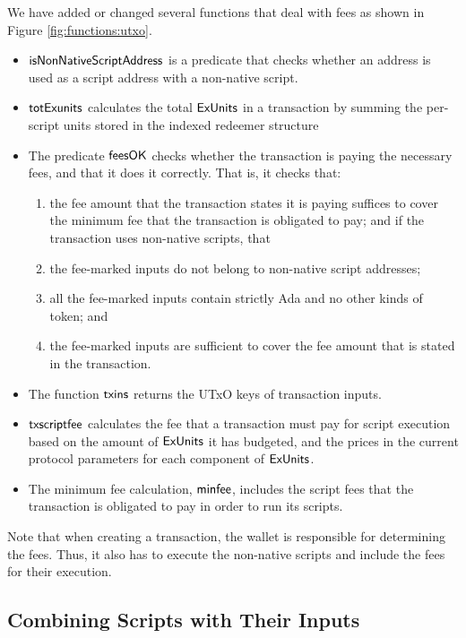 We have added or changed several functions that deal with fees as shown in Figure \ref{fig:functions:utxo}.

\begin{itemize}
  \item $\mathsf{isNonNativeScriptAddress}$ is a predicate that checks
  whether an address is used as a script address with a non-native
  script.
  \item $\mathsf{totExunits}$ calculates the total $\mathsf{ExUnits}$ in a transaction by summing
  the per-script units stored in the indexed redeemer structure
  \item The predicate $\mathsf{feesOK}$ checks whether the transaction is
  paying the necessary fees, and that it does it correctly. That is, it checks that:
  \begin{enumerate}[label=({\roman*})]
    \item the fee amount that the transaction states it is paying suffices to cover
    the minimum fee that the transaction is obligated to pay; and if the transaction uses non-native scripts, that
    \item the fee-marked inputs do not belong to non-native script addresses;
    \item all the fee-marked inputs contain strictly Ada and no other kinds of token; and
    \item the fee-marked inputs are sufficient to cover the fee amount that is stated
    in the transaction.
  \end{enumerate}
  \item The function $\mathsf{txins}$ returns the UTxO keys of transaction inputs.
  \item $\mathsf{txscriptfee}$ calculates the fee that a transaction must pay for script
  execution based on the amount of $\mathsf{ExUnits}$ it has budgeted, and the prices in the current protocol parameters
  for each component of $\mathsf{ExUnits}$.
  \item The minimum fee calculation, $\mathsf{minfee}$, includes the script
  fees that the transaction is obligated to pay in order to run its scripts.
\end{itemize}

Note that when creating a transaction, the wallet is responsible for
determining the fees. Thus, it also has to execute the non-native scripts
and include the fees for their execution.

\subsection{Combining Scripts with Their Inputs}
\label{sec:scripts-inputs}

